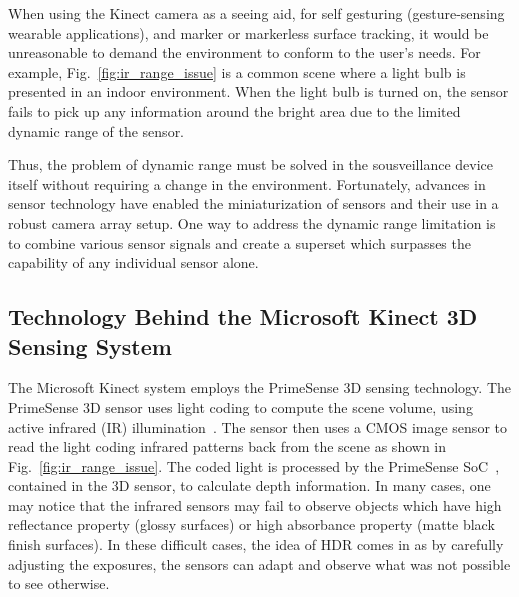 When using the Kinect camera as a seeing aid, for self gesturing (gesture-sensing wearable applications), and marker or markerless surface tracking, it would be unreasonable to demand the environment to conform to the user's needs. For example, Fig.~\ref{fig:ir_range_issue} is a common scene where a light bulb is presented in an indoor environment. When the light bulb is turned on, the sensor fails to pick up any information around the bright area due to the limited dynamic range of the sensor. 

Thus, the problem of dynamic range must be solved in the sousveillance device itself without requiring a  change in the environment. Fortunately, advances in sensor technology have enabled the miniaturization of sensors and their use in a robust camera array setup. One way to address the dynamic range limitation is to combine various sensor signals and create a superset which surpasses the capability of any individual sensor alone.

\subsection{Technology Behind the Microsoft Kinect 3D Sensing System}
The Microsoft Kinect system employs the PrimeSense 3D sensing technology. The PrimeSense 3D sensor uses light coding to compute the scene volume, using active infrared (IR) illumination~\cite{shpunt2008depth,shpunt2010optical,shpunt2007depth}. The sensor then uses a CMOS image sensor to read the light coding infrared patterns back from the scene as shown in Fig.~\ref{fig:ir_range_issue}. The coded light is processed by the PrimeSense SoC~\cite{spektor2009integrated}, contained in the 3D sensor, to calculate depth information. In many cases, one may notice that the infrared sensors may fail to observe objects which have high reflectance property (glossy surfaces) or high absorbance property (matte black finish surfaces). In these difficult cases, the idea of HDR comes in as by carefully adjusting the exposures, the sensors can adapt and observe what was not possible to see otherwise.


